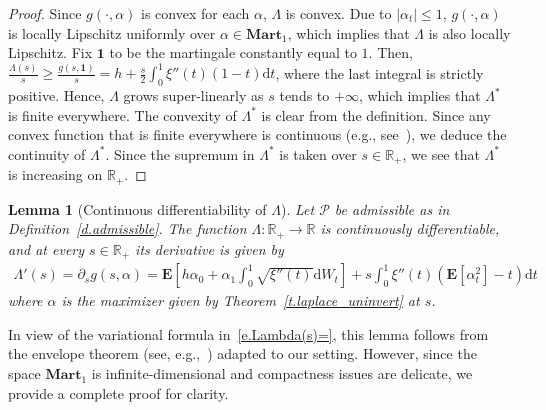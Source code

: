 \documentclass[11pt]{amsart}
\newtheorem{lemma}[proposition]{Lemma}
\theoremstyle{remark}
\theoremstyle{definition}
\numberwithin{equation}{section}
\numberwithin{proposition}{section}
\numberwithin{figure}{section}
\numberwithin{table}{section}
\newcommand{\R}{\mathbb{R}}
\newcommand{\EE}{\mathbf{E}}
\renewcommand{\leq}{\leqslant}
\renewcommand{\geq}{\geqslant}
\newcommand{\Ll}{\left}
\newcommand{\Rr}{\right}
\renewcommand{\d}{\mathrm{d}}
\newcommand{\1}{\mathbf{1}}
\newcommand{\msc}{\mathscr}
\newcommand{\bmart}{\mathbf{Mart}}
\begin{document}
\begin{proof}


Since $g(\cdot,\alpha)$ is convex for each $\alpha$, $\Lambda$ is convex. Due to $|\alpha_t|\leq 1$, $g(\cdot,\alpha)$ is locally Lipschitz uniformly over $\alpha\in\bmart_1$, which implies that $\Lambda$ is also locally Lipschitz. Fix $\mathbf{1}$ to be the martingale constantly equal to $1$. Then, $\frac{\Lambda(s)}{s}\geq \frac{g(s,\mathbf{1})}{s}= h +\frac{s}{2}\int_0^1\xi''(t)(1-t)\d t$, where the last integral is strictly positive. Hence, $\Lambda$ grows super-linearly as $s$ tends to $+\infty$, which implies that $\Lambda^*$ is finite everywhere. The convexity of $\Lambda^*$ is clear from the definition. Since any convex function that is finite everywhere is continuous (e.g., see~\cite[Proposition~2.9]{dominguez2024book}), we deduce the continuity of $\Lambda^*$. Since the supremum in $\Lambda^*$ is taken over $s\in\R_+$, we see that $\Lambda^*$ is increasing on $\R_+$.
\end{proof}




\begin{lemma}[Continuous differentiability of $\Lambda$]\label{l.Lambda'(s)=}
Let $\msc P$ be admissible as in Definition~\ref{d.admissible}.
The function $\Lambda :\R_+\to\R$ is continuously differentiable, and at every $s\in\R_+$ its derivative is given by
\begin{align}\label{e.Lambda'(s)=}
    \Lambda'(s) = \partial_s g(s,\alpha)= \EE\Ll[h\alpha_0 + \alpha_1\int_0^1\sqrt{\xi''(t)}\d W_t\Rr]+s\int_0^1 \xi''(t)\Ll(\EE\Ll[\alpha_t^2\Rr] -t \Rr)\d t
\end{align}
where $\alpha$ is the maximizer given by Theorem~\ref{t.laplace_uninvert} at $s$.
\end{lemma}

In view of the variational formula in~\eqref{e.Lambda(s)=}, this lemma follows from the envelope theorem (see, e.g.,~\cite[Theorem~2.21]{dominguez2024book}) adapted to our setting. However, since the space $\bmart_1$ is infinite-dimensional and compactness issues are delicate, we provide a complete proof for clarity.
\end{document}
